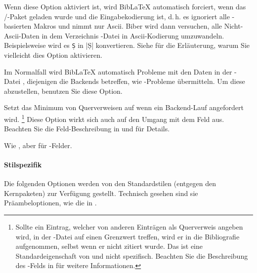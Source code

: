 \documentclass{ltxdockit}[2011/03/25]
\newcommand*{\biblatex}{BibLaTeX\xspace}
\begin{document}
\begin{optionlist}

Wenn diese Option aktiviert ist, wird \biblatex automatisch 
forciert, wenn das  \slash {}-Paket geladen wurde und
die Eingabekodierung \utf ist, d.\,h. es ignoriert alle \utf-basierten Makros
und nimmt nur Ascii. Biber wird dann versuchen, alle Nicht-Ascii-Daten in dem
Verzeichnis -Datei in Ascii-Kodierung umzuwandeln. Beispielsweise wird
es  \texttt{\d{S}} in |\d{S}| konvertieren. Siehe  für
die Erläuterung, warum Sie vielleicht dies Option aktivieren.


Im Normalfall wird \biblatex automatisch Probleme mit den Daten in der -Datei , diejenigen die Backends betreffen, wie \latex-Probleme übermitteln. Um diese abzustellen,
benutzen Sie diese Option.


Setzt das Minimum von Querverweisen auf  wenn ein Backend-Lauf
angefordert wird. \footnote{Sollte ein Eintrag, welcher von anderen Einträgen
als Querverweis angeben wird, in der -Datei auf einen Grenzwert
treffen, wird er in die Bibliografie aufgenommen, selbst wenn er nicht zitiert
wurde. Das ist eine Standardeigenschaft von \bibtex und nicht 
spezifisch. Beachten Sie die Beschreibung des -Felds in
 für weitere Informationen.} Diese Option wirkt sich auch auf den Umgang mit dem Feld  aus. Beachten Sie die Feld-Beschreibung in
 und  für Details.


Wie , aber für  -Felder.

\end{optionlist}

\paragraph{Stilspezifik} \label{use:opt:pre:bbx} 

Die folgenden Optionen werden von den Standardstilen (entgegen den Kernpaketen)
zur Verfügung gestellt. Technisch gesehen sind sie Präambeloptionen, wie die in
.
\end{document}
